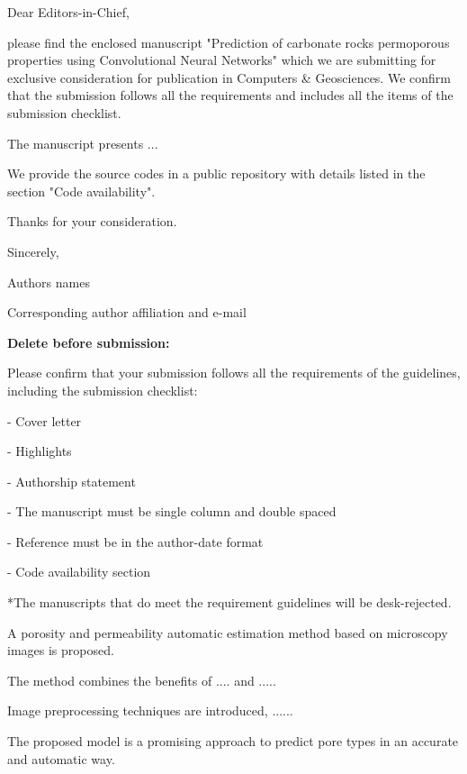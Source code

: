 \documentclass[a4paper,fleqn]{cas-sc}
\begin{document}
\begin{coverletter}

Dear Editors-in-Chief,
\newline
 
please find the enclosed manuscript "Prediction of carbonate rocks permoporous properties using Convolutional Neural Networks" which we are submitting for exclusive consideration for publication in Computers \& Geosciences. We confirm that the submission follows all the requirements and includes all the items of the submission checklist.  
\newline
 
The manuscript presents ... 
\newline

We provide the source codes in a public repository with details listed in the section "Code availability".
\newline

Thanks for your consideration. 
\newline

Sincerely,
\newline

Authors names

Corresponding author affiliation and e-mail
\newline

\textbf{Delete before submission:}

Please confirm that your submission follows all the requirements of the guidelines, including the submission checklist:

- Cover letter

- Highlights

- Authorship statement

- The manuscript must be single column and double spaced

- Reference must be in the author-date format

- Code availability section 

*The manuscripts that do meet the requirement guidelines will be desk-rejected.

\end{coverletter}

 
\begin{highlights}
\item A porosity and permeability automatic estimation method based on microscopy images is proposed.
\item The method combines the benefits of .... and .....
\item Image preprocessing techniques are introduced, ......
\item The proposed model is a promising approach to predict pore types in an accurate and automatic way.
\end{highlights}
\end{document}

